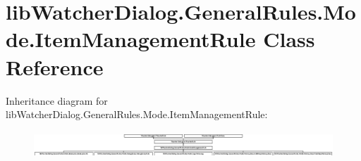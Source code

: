 \hypertarget{classlib_watcher_dialog_1_1_general_rules_1_1_mode_1_1_item_management_rule}{\section{lib\+Watcher\+Dialog.\+General\+Rules.\+Mode.\+Item\+Management\+Rule Class Reference}
\label{classlib_watcher_dialog_1_1_general_rules_1_1_mode_1_1_item_management_rule}
}
Inheritance diagram for lib\+Watcher\+Dialog.\+General\+Rules.\+Mode.\+Item\+Management\+Rule\+:\begin{figure}[H]
\begin{center}
\leavevmode
\includegraphics[height=1.015873cm]{classlib_watcher_dialog_1_1_general_rules_1_1_mode_1_1_item_management_rule}
\end{center}
\end{figure}
